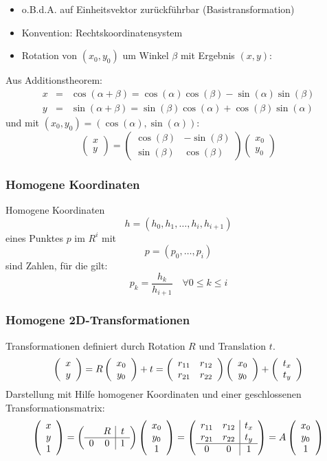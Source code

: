 \begin{itemize}
\item o.B.d.A. auf Einheitsvektor zurückführbar (Basistransformation)
\item Konvention: Rechtskoordinatensystem
\item Rotation von $(x_0,y_0)$ um Winkel $\beta$ mit Ergebnis $(x,y)$:
\end{itemize}
Aus Additionstheorem:
\begin{eqnarray*}
x &=& \cos(\alpha + \beta) = \cos(\alpha) \cos(\beta) - \sin(\alpha) \sin(\beta) \\ y &=& \sin(\alpha + \beta) = \sin(\beta) \cos(\alpha) + \cos(\beta) \sin(\alpha)
\end{eqnarray*}
und mit $(x_0,y_0) = (\cos(\alpha), \sin(\alpha))$:
$$\left( \begin{array}{c} x \\ y \end{array} \right) = \left( \begin{array}{rr} \cos(\beta) & -\sin(\beta) \\ \sin(\beta) & \cos(\beta) \end{array} \right) \left( \begin{array}{c} x_0 \\ y_0 \end{array} \right)$$

\subsubsection*{Homogene Koordinaten}

Homogene Koordinaten $$h = (h_0,h_1, \dots, h_i, h_{i+1})$$ eines Punktes $p$ im $R^i$ mit $$p = (p_0,\dots,p_i)$$ sind Zahlen, für die gilt: $$p_k = \frac{h_k}{h_{i+1}} \quad \forall 0 \leq k \leq i$$

\subsubsection*{Homogene 2D-Transformationen}

Transformationen definiert durch Rotation $R$ und Translation $t$.
$$\left( \begin{array}{c} x \\ y \end{array} \right) = R \left( \begin{array}{c} x_0 \\ y_0 \end{array} \right) + t = \left( \begin{array}{cc} r_{11} & r_{12} \\ r_{21} & r_{22} \end{array} \right) \left( \begin{array}{c} x_0 \\ y_0 \end{array} \right) + \left( \begin{array}{c} t_x \\ t_y \end{array} \right)$$
Darstellung mit Hilfe homogener Koordinaten und einer geschlossenen Transformationsmatrix:
$$\left( \begin{array}{c} x \\ y \\ 1 \end{array} \right) = \left( \begin{array}{cc|c} & R & t \\ \hline 0 & 0 & 1 \end{array} \right) \left( \begin{array}{c} x_0 \\ y_0 \\ 1 \end{array} \right) = \left( \begin{array}{cc|c} r_{11} & r_{12} & t_x \\ r_{21} & r_{22} & t_y \\ \hline 0 & 0 & 1 \end{array} \right) = A \left( \begin{array}{c} x_0 \\ y_0 \\ 1 \end{array} \right)$$

